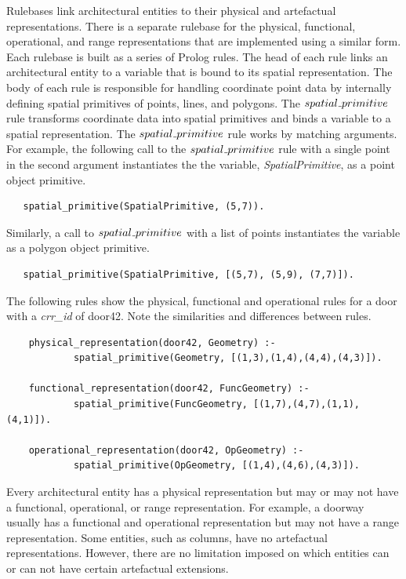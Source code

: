 \documentclass[12pt]{ucthesis}
\begin{document}
Rulebases link architectural entities to their physical and artefactual representations. There is a separate rulebase for the physical, functional, operational, and range representations that are implemented using a similar form. Each rulebase is built as a series of Prolog rules. The head of each rule links an architectural entity to a variable that is bound to its spatial representation. The body of each rule is responsible for handling coordinate point data by internally defining spatial primitives of points, lines, and polygons. The $spatial \mathunderscore primitive$ rule transforms coordinate data into spatial primitives and binds a variable to a spatial representation. The $spatial \mathunderscore primitive$ rule works by matching arguments. For example, the following call to the $spatial \mathunderscore primitive$ rule with a single point in the second argument instantiates the the variable, \emph{SpatialPrimitive}, as a point object primitive.
\begin{verbatim}
   spatial_primitive(SpatialPrimitive, (5,7)).
\end{verbatim} Similarly, a call to $spatial \mathunderscore primitive$ with a list of points instantiates the variable as a polygon object primitive.
\begin{verbatim}
   spatial_primitive(SpatialPrimitive, [(5,7), (5,9), (7,7)]).
\end{verbatim} 

The following rules show the physical, functional and operational rules for a door with a \emph{crr\_id} of door42. Note the similarities and differences between rules.
\begin{verbatim}
    physical_representation(door42, Geometry) :-
            spatial_primitive(Geometry, [(1,3),(1,4),(4,4),(4,3)]).
            
    functional_representation(door42, FuncGeometry) :-
            spatial_primitive(FuncGeometry, [(1,7),(4,7),(1,1),(4,1)]).
            
    operational_representation(door42, OpGeometry) :-
            spatial_primitive(OpGeometry, [(1,4),(4,6),(4,3)]).
\end{verbatim} Every architectural entity has a physical representation but may or may not have a functional, operational, or range representation. For example, a doorway usually has a functional and operational representation but may not have a range representation. Some entities, such as columns, have no artefactual representations. However, there are no limitation imposed on which entities can or can not have certain artefactual extensions.
\end{document}
